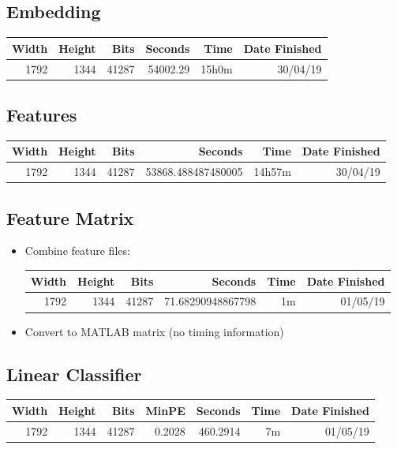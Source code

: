 \subsection{Embedding}
  \begin{center}
  \begin{tabular}{ r r | r | r r r }
  Width & Height & Bits & Seconds & Time & Date Finished \\ \hline
  1792 & 1344 & 41287 & 54002.29 & 15h0m & 30/04/19 \\
  \end{tabular}
  \end{center}

\subsection{Features}
  \begin{center}
  \begin{tabular}{ r r | r | r r r }
  Width & Height & Bits & Seconds & Time & Date Finished \\ \hline
  1792 & 1344 & 41287 & 53868.488487480005 & 14h57m & 30/04/19 \\
  \end{tabular}
  \end{center}

\subsection{Feature Matrix}
\begin{itemize}
  \item Combine feature files:
  \begin{center}
  \begin{tabular}{ r r | r | r r r }
  Width & Height & Bits & Seconds & Time & Date Finished \\ \hline
  1792 & 1344 & 41287 & 71.68290948867798 & 1m & 01/05/19 \\
  \end{tabular}
  \end{center}

  \item Convert to MATLAB matrix (no timing information)
\end{itemize}

\subsection{Linear Classifier}
  \begin{center}
  \begin{tabular}{ r r | r | r | r r r }
  Width & Height & Bits & MinPE & Seconds & Time & Date Finished \\ \hline
  1792 & 1344 & 41287 & 0.2028 & 460.2914 & 7m & 01/05/19 \\
  \end{tabular}
  \end{center}